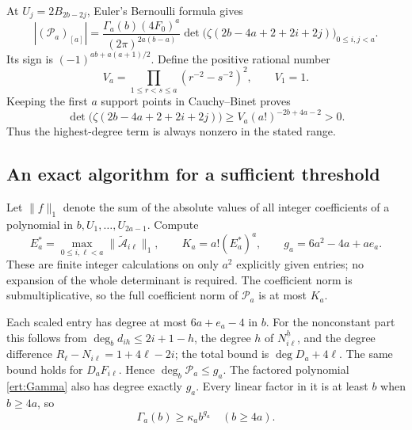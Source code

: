 \documentclass[11pt,a4paper]{article}
\numberwithin{equation}{section}
\theoremstyle{plain}
\theoremstyle{definition}
\theoremstyle{remark}
\begin{document}
At $U_j=2B_{2b-2j}$, Euler's Bernoulli formula gives
\begin{equation}\label{ert:actual-leading}
 \left|(\mathscr P_a)_{[a]}\right|
 =\frac{\Gamma_a(b)(4F_0)^a}{(2\pi)^{2a(b-a)}}
   \det\bigl(\zeta(2b-4a+2+2i+2j)\bigr)_{0\le i,j<a}.
\end{equation}
Its sign is $(-1)^{ab+a(a+1)/2}$. Define the positive rational
number
\[
 V_a=\prod_{1\le r<s\le a}(r^{-2}-s^{-2})^2,
 \qquad V_1=1.
\]
Keeping the first $a$ support points in Cauchy--Binet proves
\begin{equation}\label{ert:moment-lower}
 \det\bigl(\zeta(2b-4a+2+2i+2j)\bigr)
       \ge V_a(a!)^{-2b+4a-2}>0.
\end{equation}
Thus the highest-degree term is always nonzero in the stated range.

\subsection{An exact algorithm for a sufficient threshold}

Let $\|f\|_1$ denote the sum of the absolute values of all integer
coefficients of a polynomial in $b,U_1,\ldots,U_{2a-1}$. Compute
\[
 E_a^*=\max_{0\le i,\ell<a}\|
                  \widetilde{\mathcal A}_{i\ell}\|_1,
 \qquad K_a=a!(E_a^*)^a,
 \qquad g_a=6a^2-4a+ae_a.
\]
These are finite integer calculations on only $a^2$ explicitly given
entries; no expansion of the whole determinant is required.
The coefficient norm is submultiplicative, so the full coefficient
norm of $\mathscr P_a$ is at most $K_a$.

Each scaled entry has degree at most $6a+e_a-4$ in $b$.
For the nonconstant part this follows from
$\deg_b d_{ih}\le2i+1-h$, the degree $h$ of
$N_{i\ell}^{\underline h}$, and the degree difference
$R_\ell-N_{i\ell}=1+4\ell-2i$; the total bound is
$\deg D_a+4\ell$. The same bound holds for $D_aF_{i\ell}$.
Hence $\deg_b\mathscr P_a\le g_a$.
The factored polynomial \eqref{ert:Gamma} also has degree exactly
$g_a$. Every linear factor in it is at least $b$ when $b\ge4a$,
so
\[
 \Gamma_a(b)\ge\kappa_a b^{g_a}\quad(b\ge4a).
\]
\end{document}
